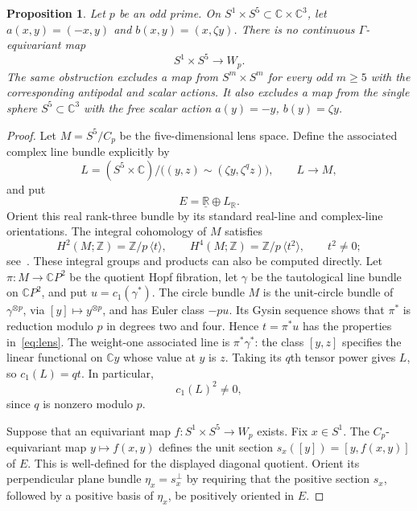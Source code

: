 \documentclass[11pt]{amsart}
\newtheorem{proposition}[theorem]{Proposition}
\theoremstyle{definition}
\theoremstyle{remark}
\numberwithin{equation}{section}
\newcommand{\R}{\mathbb R}
\newcommand{\C}{\mathbb C}
\newcommand{\Z}{\mathbb Z}
\newcommand{\triv}{\underline{\R}}
\begin{document}
\begin{proposition}\label{prop:obstruction}
Let $p$ be an odd prime. On $S^1\times S^5\subset\C\times\C^3$, let $a(x,y)=(-x,y)$ and $b(x,y)=(x,\zeta y)$. There is no continuous $\Gamma$-equivariant map
\[
 S^1\times S^5\longrightarrow W_p.
\]
The same obstruction excludes a map from $S^m\times S^m$ for every odd $m\geq5$ with the corresponding antipodal and scalar actions. It also excludes a map from the single sphere $S^5\subset\C^3$ with the free scalar action $a(y)=-y$, $b(y)=\zeta y$.
\end{proposition}
\begin{proof}
Let $M=S^5/C_p$ be the five-dimensional lens space. Define the associated complex line bundle explicitly by
\[
 L=(S^5\times\C)/\bigl((y,z)\sim(\zeta y,\zeta^q z)\bigr),
 \qquad L\longrightarrow M,
\]
and put
\[
 E=\triv\oplus L_{\R}.
\]
Orient this real rank-three bundle by its standard real-line and complex-line orientations. The integral cohomology of $M$ satisfies
\begin{equation}\label{eq:lens}
 H^2(M;\Z)=\Z/p\,\langle t\rangle,\qquad
 H^4(M;\Z)=\Z/p\,\langle t^2\rangle,
 \qquad t^2\neq0;
\end{equation}
see~\cite[Example~3.41]{HatcherAT}. These integral groups and products can also be computed directly. Let $\pi:M\to\C P^2$ be the quotient Hopf fibration, let $\gamma$ be the tautological line bundle on $\C P^2$, and put $u=c_1(\gamma^*)$. The circle bundle $M$ is the unit-circle bundle of $\gamma^{\otimes p}$, via $[y]\mapsto y^{\otimes p}$, and has Euler class $-pu$. Its Gysin sequence shows that $\pi^*$ is reduction modulo $p$ in degrees two and four. Hence $t=\pi^*u$ has the properties in~\eqref{eq:lens}. The weight-one associated line is $\pi^*\gamma^*$: the class $[y,z]$ specifies the linear functional on $\C y$ whose value at $y$ is $z$. Taking its $q$th tensor power gives $L$, so $c_1(L)=qt$. In particular,
\begin{equation}\label{eq:chern-nonzero}
 c_1(L)^2\neq0,
\end{equation}
since $q$ is nonzero modulo $p$.

Suppose that an equivariant map $f:S^1\times S^5\to W_p$ exists. Fix $x\in S^1$. The $C_p$-equivariant map $y\mapsto f(x,y)$ defines the unit section $s_x([y])=[y,f(x,y)]$ of $E$. This is well-defined for the displayed diagonal quotient. Orient its perpendicular plane bundle $\eta_x=s_x^{\perp}$ by requiring that the positive section $s_x$, followed by a positive basis of $\eta_x$, be positively oriented in $E$.


\end{proof}
\end{document}
